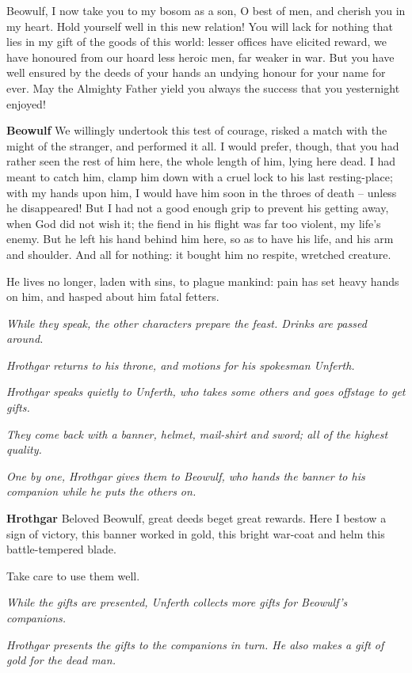 \documentclass[a4paper]{article}
\begin{document}
{Beowulf, I now take you
to my bosom as a son, O best of men,
and cherish you in my heart. Hold yourself well
in this new relation! You will lack for nothing
that lies in my gift of the goods of this world:
lesser offices have elicited reward,
we have honoured from our hoard less heroic men,
far weaker in war. But you have well ensured
by the deeds of your hands an undying honour
for your name for ever. May the Almighty Father
yield you always the success that you yesternight enjoyed!

\textbf{Beowulf} We willingly undertook this test of courage,
risked a match with the might of the stranger,
and performed it all. I would prefer, though,
that you had rather seen the rest of him here,
the whole length of him, lying here dead.
I had meant to catch him, clamp him down
with a cruel lock to his last resting-place;
with my hands upon him, I would have him soon
in the throes of death – unless he disappeared!
But I had not a good enough grip to prevent
his getting away, when God did not wish it;
the fiend in his flight was far too violent,
my life’s enemy. But he left his hand
behind him here, so as to have his life,
and his arm and shoulder. And all for nothing:
it bought him no respite, wretched creature.

He lives no longer, laden with sins,
to plague mankind: pain has set
heavy hands on him, and hasped about him
fatal fetters. 

\centerline{\textit{While they speak, the other characters prepare the feast. Drinks are passed around.}}
\centerline{\textit{Hrothgar returns to his throne, and motions for his spokesman Unferth.}}

\centerline{\textit{Hrothgar speaks quietly to Unferth, who takes some others and goes offstage to get gifts.}}
\centerline{\textit{They come back with a banner, helmet, mail-shirt and sword; all of the highest quality.}}
\centerline{\textit{One by one, Hrothgar gives them to Beowulf, who hands the banner to his companion while he puts the others on.}}

\textbf{Hrothgar} Beloved Beowulf,
great deeds beget great rewards. 
Here I bestow a sign of victory,
this banner worked in gold,
this bright war-coat and helm
this battle-tempered blade.

Take care to use them well.

\centerline{\textit{While the gifts are presented, Unferth collects more gifts for Beowulf's companions.}}
\centerline{\textit{Hrothgar presents the gifts to the companions in turn. He also makes a gift of gold for the dead man.}}

}
\end{document}
